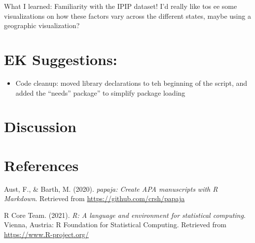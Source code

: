 \documentclass[
  english,
  man]{apa6}
\providecommand{\tightlist}{%
  \setlength{\itemsep}{0pt}\setlength{\parskip}{0pt}}
\newlength{\cslhangindent}
\newlength{\cslentryspacingunit} %
\newenvironment{CSLReferences}[2] %
 {%
  \setlength{\parindent}{0pt}
  \ifodd #1
  \let\oldpar\par
  \def\par{\hangindent=\cslhangindent\oldpar}
  \fi
  \setlength{\parskip}{#2\cslentryspacingunit}
 }%
 {}
\begin{document}
What I learned: Familiarity with the IPIP dataset! I'd really like tos ee some visualizations on how these factors vary across the different states, maybe using a geographic visualization?

\hypertarget{ek-suggestions}{%
\section{EK Suggestions:}\label{ek-suggestions}}

\begin{itemize}
\tightlist
\item
  Code cleanup: moved library declarations to teh beginning of the script, and added the ``needs'' package'' to simplify package loading
\end{itemize}

\hypertarget{discussion}{%
\section{Discussion}\label{discussion}}

\newpage

\hypertarget{references}{%
\section{References}\label{references}}

\begingroup
\setlength{\parindent}{-0.5in}
\setlength{\leftskip}{0.5in}

\hypertarget{refs}{}
\begin{CSLReferences}{1}{0}
\leavevmode{}%
Aust, F., \& Barth, M. (2020). \emph{{papaja}: {Create} {APA} manuscripts with {R Markdown}}. Retrieved from \url{https://github.com/crsh/papaja}

\leavevmode{}%
R Core Team. (2021). \emph{R: A language and environment for statistical computing}. Vienna, Austria: R Foundation for Statistical Computing. Retrieved from \url{https://www.R-project.org/}

\end{CSLReferences}

\endgroup
\end{document}
